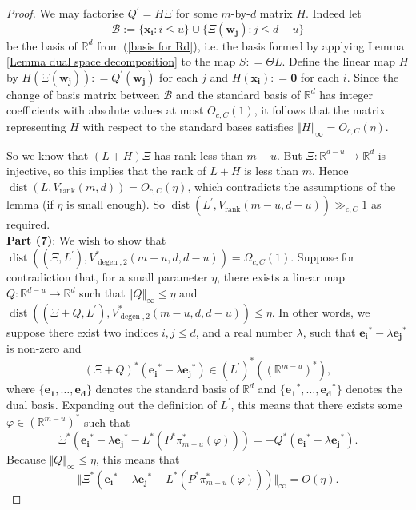 \documentclass[12pt,a4paper,twoside,reqno]{amsart}
\newcommand{\degen}{\operatorname{degen}}
\newcommand{\rank}{\operatorname{rank}}
\newcommand{\dist}{\operatorname{dist}}
\numberwithin{equation}{section}
\begin{document}
\begin{proof}
We may factorise $Q^\prime = H\Xi$ for some $m$-by-$d$ matrix $H$. Indeed let \[\mathcal{B} := \{ \mathbf{x_i}: i\leqslant u\} \cup \{\Xi(\mathbf{w_j}): j\leqslant d-u\}\] be the basis of $\mathbb{R}^d$ from (\ref{basis for Rd}), i.e. the basis formed by applying Lemma \ref{Lemma dual space decomposition} to the map $S: = \Theta L$. Define the linear map $H$ by $H(\Xi(\mathbf{w_j})): = Q^\prime(\mathbf{w_{j}})$ for each $j$ and $H(\mathbf{x_i}): = \mathbf{0}$ for each $i$. Since the change of basis matrix between $\mathcal{B}$ and the standard basis of $\mathbb{R}^d$ has integer coefficients with absolute values at most $O_{c,C}(1)$, it follows that the matrix representing $H$ with respect to the standard bases satisfies $\Vert H\Vert_\infty = O_{c,C}(\eta)$.

So we know that $(L+H)\Xi$ has rank less than $m-u$. But $\Xi:\mathbb{R}^{d-u} \longrightarrow \mathbb{R}^d$ is injective, so this implies that the rank of $L+H$ is less than $m$. Hence $\dist(L,V_{\rank}(m,d)) = O_{c,C}(\eta)$, which contradicts the assumptions of the lemma (if $\eta$ is small enough). So $\dist(L^\prime,V_{\rank}(m-u,d-u)) \gg_{c,C} 1$ as required. \\

\textbf{Part (7)}: We wish to show that $\dist((\Xi,L^\prime),V_{\degen,2}^*(m-u,d,d-u)) = \Omega_{c,C}(1)$. Suppose for contradiction that, for a small parameter $\eta$, there exists a linear map $Q:\mathbb{R}^{d-u} \longrightarrow \mathbb{R}^d$ such that  $\Vert Q\Vert_\infty \leqslant \eta$ and $\dist((\Xi + Q, L^\prime ),V_{\degen,2}^*(m-u,d,d-u)) \leqslant \eta$. In other words, we suppose there exist two indices $i,j\leqslant d$, and a real number $\lambda$, such that $\mathbf{e_i}^* - \lambda\mathbf{e_j}^*$ is non-zero and \[ (\Xi + Q)^*(\mathbf{e_i}^* - \lambda\mathbf{e_j}^*) \in (L^\prime)^*((\mathbb{R}^{m-u})^*),\] where $\{\mathbf{e_1},\dots,\mathbf{e_d}\}$ denotes the standard basis of $\mathbb{R}^d$ and $\{\mathbf{e_1}^*,\dots,\mathbf{e_d}^*\}$ denotes the dual basis. Expanding out the definition of $L^\prime$, this means that there exists some $\varphi \in (\mathbb{R}^{m-u})^*$ such that \[\Xi^*(\mathbf{e_i}^* - \lambda\mathbf{e_j}^* - L^*(P^* \pi_{m-u}^*(\varphi))) = -Q^*(\mathbf{e_i}^* - \lambda\mathbf{e_j}^*).\] Because $\Vert Q\Vert_\infty \leqslant \eta$, this means that 
\begin{equation}
\label{about to be dualed}
\Vert \Xi^*(\mathbf{e_i}^* - \lambda\mathbf{e_j}^* - L^*(P^* \pi_{m-u}^*(\varphi)))\Vert_\infty = O(\eta).
\end{equation}


\end{proof}
\end{document}

